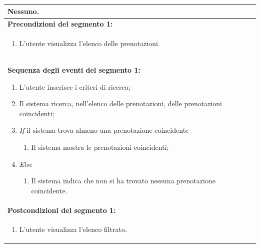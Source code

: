 \documentclass{article}
\begin{document}
\begin{table}[t]
\begin{tabular}{|p{\linewidth}|}
                        Nessuno. \\
                        \hline
                        \cellcolor{gray!20}
                        \textbf{Precondizioni del segmento 1:} \\
                        \cellcolor{gray!20}
                        \begin{minipage}{\linewidth}
                            \begin{enumerate}
                                \item L'utente visualizza l'elenco delle prenotazioni.
                            \end{enumerate}
                        \end{minipage} \\
                        \hline
                        \textbf{Sequenza degli eventi del segmento 1:}
                        \begin{enumerate}
                            \item L'utente inserisce i criteri di ricerca;
                            \item Il sistema ricerca, nell'elenco delle prenotazioni, delle prenotazioni coincidenti;
                            \item \textit{If} il sistema trova almeno una prenotazione coincidente
                            \begin{enumerate}
                                \item Il sistema mostra le prenotazioni coincidenti;
                            \end{enumerate}
                            \item \textit{Else}
                            \begin{enumerate}
                                \item Il sistema indica che non si ha trovato nessuna prenotazione coincidente.
                            \end{enumerate}
                        \end{enumerate} \\
                        \hline
                        \cellcolor{gray!20}
                        \textbf{Postcondizioni del segmento 1:} \\
                        \cellcolor{gray!20}
                        \begin{minipage}{\linewidth}
                            \begin{enumerate}
                                \item L'utente visualizza l'elenco filtrato.
                            \end{enumerate}
                        \end{minipage} \\
                        \hline
                    \end{tabular}
                \end{table}
\end{document}
